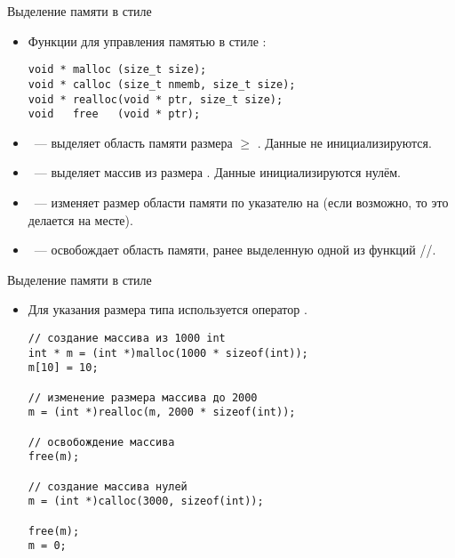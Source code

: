 \documentclass{beamer}
\begin{document}
\begin{frame}[fragile]{Выделение памяти в стиле \langc}
    \begin{itemize}
        \item Функции для управления памятью в стиле \langc:
            {\small
\begin{lstlisting}
void * malloc (size_t size);
void * calloc (size_t nmemb, size_t size);
void * realloc(void * ptr, size_t size);
void   free   (void * ptr);               
\end{lstlisting}
}
        \item {}~--- выделяет область памяти размера $\ge$
            . Данные не инициализируются.

        \item {}~--- выделяет массив из  размера 
            . Данные инициализируются нулём.

        \item {}~--- изменяет размер области памяти по указателю
             на  (если возможно, то это делается на месте).

        \item {}~--- освобождает область памяти, ранее выделенную
            одной из функций //.
            
    \end{itemize}
\end{frame}

\begin{frame}[fragile]{Выделение памяти в стиле \langc}
    \begin{itemize}
        \item Для указания размера типа используется оператор .
\begin{lstlisting}
// создание массива из 1000 int    
int * m = (int *)malloc(1000 * sizeof(int));
m[10] = 10;

// изменение размера массива до 2000
m = (int *)realloc(m, 2000 * sizeof(int));

// освобождение массива
free(m);

// создание массива нулей
m = (int *)calloc(3000, sizeof(int));

free(m);
m = 0;
\end{lstlisting}
    \end{itemize}
\end{frame}
\end{document}
